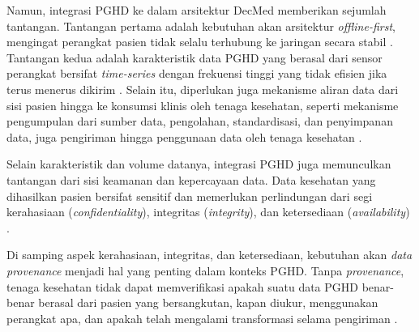 Namun, integrasi PGHD ke dalam arsitektur DecMed memberikan sejumlah tantangan.
Tantangan pertama adalah kebutuhan akan arsitektur \textit{offline-first}, mengingat perangkat pasien tidak selalu terhubung ke jaringan secara stabil \parencite{Khatiwada_Yang_Lin_Blobel_2024_PGHD_Understanding}.
Tantangan kedua adalah karakteristik data PGHD yang berasal dari sensor perangkat bersifat \textit{time-series} dengan frekuensi tinggi yang tidak efisien jika terus menerus dikirim \parencite{Haque_2024_Performance_Blockchain}.
Selain itu, diperlukan juga mekanisme aliran data dari sisi pasien hingga ke konsumsi klinis oleh tenaga kesehatan, seperti mekanisme pengumpulan dari sumber data, pengolahan, standardisasi, dan penyimpanan data, juga pengiriman hingga penggunaan data oleh tenaga kesehatan \parencite{Zeng2022-Standardized-PGD}. 

Selain karakteristik dan volume datanya, integrasi PGHD juga memunculkan tantangan dari sisi keamanan dan kepercayaan data.
Data kesehatan yang dihasilkan pasien bersifat sensitif dan memerlukan perlindungan dari segi kerahasiaan (\textit{confidentiality}), integritas (\textit{integrity}), dan ketersediaan (\textit{availability}) \parencite{Khatiwada_Yang_Lin_Blobel_2024_PGHD_Understanding}.

Di samping aspek kerahasiaan, integritas, dan ketersediaan, kebutuhan akan \textit{data provenance} menjadi hal yang penting dalam konteks PGHD\@. 
Tanpa \textit{provenance}, tenaga kesehatan tidak dapat memverifikasi apakah suatu data PGHD benar-benar berasal dari pasien yang bersangkutan, kapan diukur, menggunakan perangkat apa, dan apakah telah mengalami transformasi selama pengiriman \parencite{Ahmed_2023_Data_Provenance}. 
